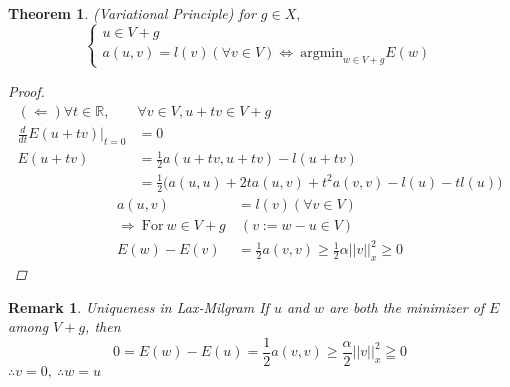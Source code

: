 \documentclass[a4paper,12pt]{article}
\newtheorem{remark}{Remark}[]
\newtheorem{theorem}{Theorem}
\newcommand{\R}{\mathbb{R}}
\begin{document}
\begin{theorem}(Variational Principle) for $g \in X,$
\begin{equation*}
\begin{cases}
u \in V+g\\
a(u,v) = l(v) (\forall v \in V) \Leftrightarrow\ \text{argmin}_{w \in V+g} E(w)
\end{cases}
\end{equation*}
\begin{proof}
	\begin{equation*}
	\begin{aligned}
	(\Leftarrow) \forall t \in \R,& \forall v \in V, u+tv \in V+g\\
	\frac{d}{dt} E(u+tv)|_{t=0} &= 0\\
	E(u+tv) &= \frac{1}{2} a(u+tv, u+tv) -l(u+tv)\\
	&= \frac{1}{2}\bigg(a(u,u)+2ta(u,v)+t^2a(v,v)-l(u)-tl(u)\bigg)
	\end{aligned}
	\end{equation*}
	\begin{equation*}
	\begin{aligned}
	a(u,v) &= l(v) (\forall v \in V)\\
	\Rightarrow\ \text{For}\ w \in V+g&\ (v:=w-u\in V)\\
	E(w) - E(v) &= \frac{1}{2} a(v,v) \geq \frac{1}{2} \alpha ||v||_x^2 \geq 0  
	\end{aligned}
	\end{equation*}
\end{proof}
\end{theorem}
\begin{remark} Uniqueness in Lax-Milgram
	If $u$ and $w$ are both the minimizer of $E$ among $V+g$, then
	\begin{equation*}
	0=E(w) - E(u) = \frac{1}{2} a(v,v) \geq \frac{\alpha}{2} ||v||^2_x \geqq 0
	\end{equation*}
	$\therefore v=0,\ \therefore w = u$
\end{remark}
\end{document}

